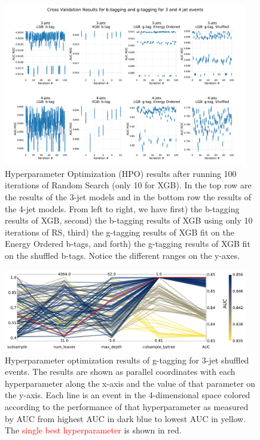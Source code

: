 \begin{figure}
  \includegraphics[width=0.95\textwidth, trim=10 10 10 60, clip]{figures/quarks/cv_res_lgb-down_sample=1.00-ML_vars=vertex-selection=b-ejet_min=4-n_iter_RS_lgb=99-n_iter_RS_xgb=9-cdot_cut=0.90-version=19.pdf}
  \caption[Hyperparameter Optimization of b- and g-tagging]
          {Hyperparameter Optimization (HPO) results after running 100 iterations of Random Search (only 10 for XGB). In the top row are the results of the 3-jet models and in the bottom row the results of the 4-jet models. From left to right, we have first) the b-tagging results of XGB, second) the b-tagging results of XGB using only 10 iterations of RS, third) the g-tagging results of XGB fit on the Energy Ordered b-tags, and forth) the g-tagging results of XGB fit on the shuffled b-tags. Notice the different ranges on the y-axes.
          } 
  \label{fig:q:CV_res_iterations}
\end{figure}


\begin{figure}
  \includegraphics[width=0.95\textwidth, trim=0 0 0 0, clip]{figures/quarks/CV_viz-njet=3-name=lf_gtag_shuffled_lgb_down_sample=1.00-ML_vars=vertex-selection=b-ejet_min=4-n_iter_RS_lgb=99-n_iter_RS_xgb=9-cdot_cut=0.90-version=19.pdf}
  \caption[Overview of Hyperparamaters of g-tagging for 3-jet shuffled events]
          {Hyperparameter optimization results of g-tagging for 3-jet shuffled events. The results are shown as parallel coordinates with each hyperparameter along the x-axis and the value of that parameter on the y-axis. Each line is an event in the 4-dimensional space colored according to the performance of that hyperparameter as measured by AUC from \textcolor{viridis-dark}{highest} AUC in dark blue to \textcolor{viridis-light}{lowest} AUC in yellow. The \textcolor{red}{single best hyperparameter} is shown in red. 
          } 
  \label{fig:q:initial_CV_res_parallel_coords}
\end{figure}



